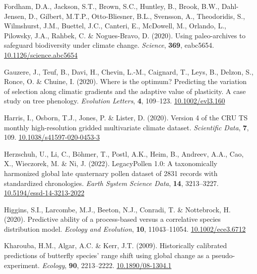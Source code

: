 \documentclass[11pt,]{article}
\newlength{\cslhangindent}
\newenvironment{CSLReferences}[2] %
 {%
  \setlength{\parindent}{0pt}
  \ifodd #1 \everypar{\setlength{\hangindent}{\cslhangindent}}\ignorespaces\fi
  \ifnum #2 > 0
  \setlength{\parskip}{#2\baselineskip}
  \fi
 }%
 {}
\begin{document}
\begin{CSLReferences}{1}{0}
\leavevmode{}%
Fordham, D.A., Jackson, S.T., Brown, S.C., Huntley, B., Brook, B.W.,
Dahl-Jensen, D., Gilbert, M.T.P., Otto-Bliesner, B.L., Svensson, A.,
Theodoridis, S., Wilmshurst, J.M., Buettel, J.C., Canteri, E., McDowell,
M., Orlando, L., Pilowsky, J.A., Rahbek, C. \& Nogues-Bravo, D. (2020).
Using paleo-archives to safeguard biodiversity under climate change.
\emph{Science}, \textbf{369}, eabc5654.
\href{https://doi.org/10.1126/science.abc5654}{10.1126/science.abc5654}

\leavevmode{}%
Gauzere, J., Teuf, B., Davi, H., Chevin, L.-M., Caignard, T., Leys, B.,
Delzon, S., Ronce, O. \& Chuine, I. (2020). Where is the optimum?
{Predicting} the variation of selection along climatic gradients and the
adaptive value of plasticity. {A} case study on tree phenology.
\emph{Evolution Letters}, \textbf{4}, 109--123.
\href{https://doi.org/10.1002/evl3.160}{10.1002/evl3.160}

\leavevmode{}%
Harris, I., Osborn, T.J., Jones, P. \& Lister, D. (2020). Version 4 of
the {CRU} {TS} monthly high-resolution gridded multivariate climate
dataset. \emph{Scientific Data}, \textbf{7}, 109.
\href{https://doi.org/10.1038/s41597-020-0453-3}{10.1038/s41597-020-0453-3}

\leavevmode{}%
Herzschuh, U., Li, C., Böhmer, T., Postl, A.K., Heim, B., Andreev, A.A.,
Cao, X., Wieczorek, M. \& Ni, J. (2022). LegacyPollen 1.0: A
taxonomically harmonized global late quaternary pollen dataset of 2831
records with standardized chronologies. \emph{Earth System Science
Data}, \textbf{14}, 3213--3227.
\href{https://doi.org/10.5194/essd-14-3213-2022}{10.5194/essd-14-3213-2022}

\leavevmode{}%
Higgins, S.I., Larcombe, M.J., Beeton, N.J., Conradi, T. \& Nottebrock,
H. (2020). Predictive ability of a process-based versus a correlative
species distribution model. \emph{Ecology and Evolution}, \textbf{10},
11043--11054.
\href{https://doi.org/10.1002/ece3.6712}{10.1002/ece3.6712}

\leavevmode{}%
Kharouba, H.M., Algar, A.C. \& Kerr, J.T. (2009). Historically
calibrated predictions of butterfly species' range shift using global
change as a pseudo-experiment. \emph{Ecology}, \textbf{90}, 2213--2222.
\href{https://doi.org/10.1890/08-1304.1}{10.1890/08-1304.1}


\end{CSLReferences}
\end{document}
